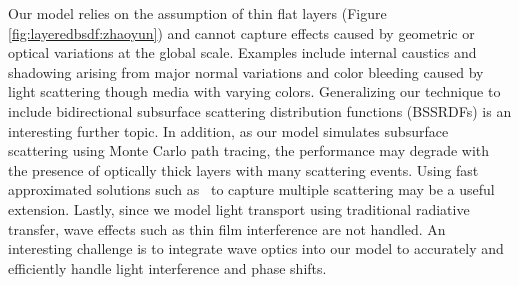 Our model relies on the assumption of thin flat layers (Figure \ref{fig:layeredbsdf:zhaoyun}) and cannot capture effects caused by geometric or optical variations at the global scale.
Examples include internal caustics and shadowing arising from major normal variations and color bleeding caused by light scattering though media with varying colors.
Generalizing our technique to include bidirectional subsurface scattering distribution functions (BSSRDFs) is an interesting further topic.
In addition, as our model simulates subsurface scattering using Monte Carlo path tracing, the performance may degrade with the presence of optically thick layers with many scattering events.
Using fast approximated solutions such as~\cite{jensen2001practical,frisvad2014directional} to capture multiple scattering may be a useful extension.
Lastly, since we model light transport using traditional radiative transfer, wave effects such as thin film interference are not handled.
An interesting challenge is to integrate wave optics into our model to accurately and efficiently handle light interference and phase shifts.


